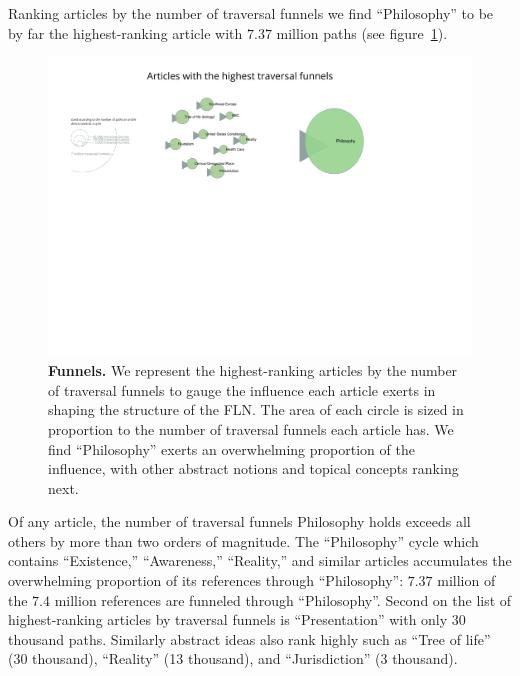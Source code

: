 \documentclass[pre,twocolumn,twoside,superscriptaddress,floatfix, aps, 10pt]{revtex4-1}
\begin{document}
Ranking articles by the number of traversal funnels we find 
``Philosophy'' to be by far the highest-ranking article with 
$7.37$ million paths
(see figure~\ref{fig:Funnels}).
\begin{figure}[tp!]
  \centering	
  \includegraphics[width=\textwidth]{graphics/funnels.pdf}
  \caption{
    \textbf{Funnels.}
    We represent the highest-ranking articles by the number of traversal 
    funnels to gauge the influence each article exerts in shaping the 
    structure of the FLN. 
    The area of each circle is sized in proportion to the number of 
    traversal funnels each article has. 
    We find ``Philosophy'' exerts an overwhelming proportion
    of the influence, with other abstract notions and topical concepts ranking
    next.
  }
  \label{fig:Funnels}
\end{figure}
Of any article, the number of traversal funnels Philosophy holds exceeds 
all others by more than two orders of magnitude.
The ``Philosophy'' cycle which contains ``Existence,'' ``Awareness,'' ``Reality,'' 
and similar articles accumulates the overwhelming proportion of its 
references through ``Philosophy'': $7.37$ million of the $7.4$ million references
are funneled through ``Philosophy''.
Second on the list of highest-ranking articles by traversal funnels is 
``Presentation'' with only $30$ thousand paths. Similarly abstract 
ideas also rank highly such as ``Tree of life'' (30 thousand), 
``Reality'' (13 thousand), and ``Jurisdiction'' (3 thousand).
\end{document}
